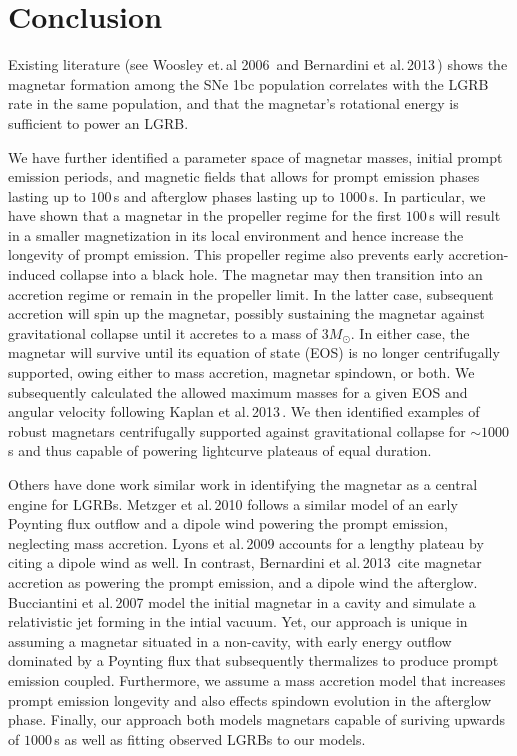 \documentclass{article}
\begin{document}
\section{Conclusion}

Existing literature (see Woosley et.\,al 2006\,\cite{Woosley:2006fn} and Bernardini et al.\,2013\,\cite{Bernardini:2013nfa}) shows the magnetar formation among the SNe 1bc population correlates with the LGRB rate in the same population, and that the magnetar's rotational energy is sufficient to power an LGRB.

We have further identified a parameter space of magnetar masses, initial prompt emission periods, and magnetic fields that allows for prompt emission phases lasting up to $100$\,s and afterglow phases lasting up to $1000$\,s. In particular, we have shown that a magnetar in the propeller regime for the first $100$\,s will result in a smaller magnetization in its local environment and hence increase the longevity of prompt emission. This propeller regime also prevents early accretion-induced collapse into a black hole. The magnetar may then transition into an accretion regime or remain in the propeller limit. In the latter case, subsequent accretion will spin up the magnetar, possibly sustaining the magnetar against gravitational collapse until it accretes to a mass of $3M_{\odot}$. In either case, the magnetar will survive until its equation of state (EOS) is no longer centrifugally supported, owing either to mass accretion, magnetar spindown, or both. We subsequently calculated the allowed maximum masses for a given EOS and angular velocity following Kaplan et al.\,2013\,\cite{Kaplan:2013wra}. We then identified examples of robust magnetars centrifugally supported against gravitational collapse for $\sim 1000$\,s and thus capable of powering lightcurve plateaus of equal duration.

Others have done work similar work in identifying the magnetar as a central engine for LGRBs. Metzger et al.\,2010 \cite{Metzger:2010pp} follows a similar model of an early Poynting flux outflow and a dipole wind powering the prompt emission, neglecting mass accretion. Lyons et al.\,2009 \cite{Lyons:2009ka} accounts for a lengthy plateau by citing a dipole wind as well. In contrast, Bernardini et al.\,2013\,\cite{Bernardini:2013nfa} cite magnetar accretion as powering the prompt emission, and a dipole wind the afterglow. Bucciantini et al.\,2007 \cite{Bucciantini:2007hy} model the initial magnetar in a cavity and simulate a relativistic jet forming in the intial vacuum. Yet, our approach is unique in assuming a magnetar situated in a non-cavity, with early energy outflow dominated by a Poynting flux that subsequently thermalizes to produce prompt emission coupled. Furthermore, we assume a mass accretion model that increases prompt emission longevity and also effects spindown evolution in the afterglow phase. Finally, our approach both models magnetars capable of suriving upwards of $1000$\,s as well as fitting observed LGRBs to our models.
\end{document}

